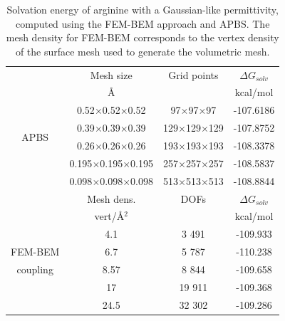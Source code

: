 \begin{table}
\centering
\begin{tabular}{c|c|c|c}
&Mesh size  & Grid points & $\Delta G_{solv}$\\
&\AA       & &  kcal/mol \\
\hline
\multirow{4}{*}{APBS}& 0.52$\times$0.52$\times$0.52 & 97$\times$97$\times$97 & -107.6186 \\ 
& 0.39$\times$0.39$\times$0.39 & 129$\times$129$\times$129 & -107.8752\\ 
&0.26$\times$0.26$\times$0.26 & 193$\times$193$\times$193& -108.3378\\ 
&0.195$\times$0.195$\times$0.195 & 257$\times$257$\times$257& -108.5837\\ 
&0.098$\times$0.098$\times$0.098 & 513$\times$513$\times$513& -108.8844\\ 
\hline
&Mesh dens. & DOFs & $\Delta G_{solv}$\\
&vert/\AA$^2$   &  &  kcal/mol \\
\hline
    & 4.1 & 3 491 & -109.933 \\
FEM-BEM    & 6.7  & 5 787 & -110.238 \\
coupling    & 8.57  & 8 844 & -109.658 \\
    & 17 & 19 911 & -109.368 \\
    & 24.5 & 32 302 & -109.286 \\
\hline
\end{tabular}
\caption{Solvation energy of arginine with a Gaussian-like permittivity, computed using the FEM-BEM approach and APBS. The mesh density for FEM-BEM corresponds to the vertex density of the surface mesh used to generate the volumetric mesh.}
\label{table:arg2_variable}
\end{table}


